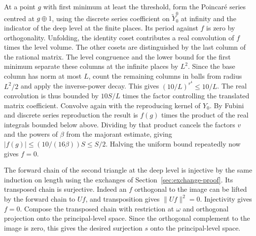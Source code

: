 At a point \(g\) with first minimum at least the threshold, form
the Poincaré series centred at \(g\oplus1\), using the discrete
series coefficient on \(\widetilde Y_0^0\) at infinity and the
indicator of the deep level at the finite places. Its period against
\(f\) is zero by orthogonality.
Unfolding, the identity coset contributes a real convolution of \(f\)
times the level volume. The other cosets are distinguished by the
last column of the rational matrix. The level congruence and the
lower bound for the first minimum separate these columns at the
infinite places by \(L^2\). Since the base column has norm at most \(L\),
count the remaining columns in balls from radius \(L^2/2\) and
apply the inverse-power decay. This gives
\((10/L)^{r^4}\le10/L\).
The real convolution is thus bounded by \(10S/L\) times the
factor controlling the translated matrix coefficient.
Convolve again with the reproducing kernel of \(Y_0\).
By Fubini and discrete series reproduction the result is \(f(g)\)
times the product of the real integrals bounded below above.
Dividing by that product cancels the factors \(v\) and the
powers of \(\beta\) from the majorant estimate, giving
\(|f(g)|\le (10/(16\beta))S\le S/2\).
Halving the uniform bound repeatedly now gives \(f=0\).

The forward chain of the second triangle at the deep level is
injective by the same induction on length using the exchanges of
Section~\ref{sec:exchange-proof}. Its transposed chain is surjective.
Indeed an \(f\) orthogonal to the image can be lifted by the forward
chain to \(Uf\), and transposition gives \(\|Uf\|^2=0\).
Injectivity gives \(f=0\).
Compose the transposed chain with restriction at \(\omega\) and
orthogonal projection onto the principal-level space. Since the
orthogonal complement to the image is zero, this gives the desired
surjection \(s\) onto the principal-level space.
